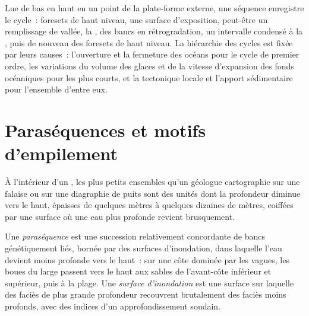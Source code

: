 Lue de bas en haut en un point de la plate-forme externe, une séquence enregistre
le cycle~: foresets de haut niveau, une surface d'exposition, peut-être un remplissage de vallée,
la , des bancs en rétrogradation, un intervalle condensé à la
, puis de nouveau des foresets de haut niveau. La hiérarchie des
cycles est fixée par leurs causes~: l'ouverture et la fermeture des océans pour le
cycle de premier ordre, les variations du volume des glaces et de la vitesse d'expansion des fonds
océaniques pour les plus courts, et la tectonique locale et l'apport sédimentaire pour l'ensemble
d'entre eux.

\section{Paraséquences et motifs d'empilement}\label{sec:b3:sequence-stratigraphy:parasequences}

À l'intérieur d'un , les plus petits ensembles qu'un géologue cartographie sur une falaise ou sur une diagraphie de puits
sont des unités dont la profondeur diminue vers le haut, épaisses de quelques mètres à quelques dizaines de mètres,
coiffées par une surface où une eau plus profonde revient brusquement.

\begin{definition}\label{def:b3:sequence-stratigraphy:parasequence}
Une \emph{paraséquence} est une succession relativement concordante de bancs génétiquement liés,
bornée par des surfaces d'inondation, dans laquelle l'eau devient moins profonde vers le haut~: sur une côte dominée par les vagues,
les boues du large passent vers le haut aux sables de l'avant-côte inférieur et supérieur, puis à la plage. Une
\emph{surface d'inondation} est une surface sur laquelle des faciès de plus grande profondeur
recouvrent brutalement des faciès moins profonds,
avec des indices d'un approfondissement soudain.
\end{definition}

